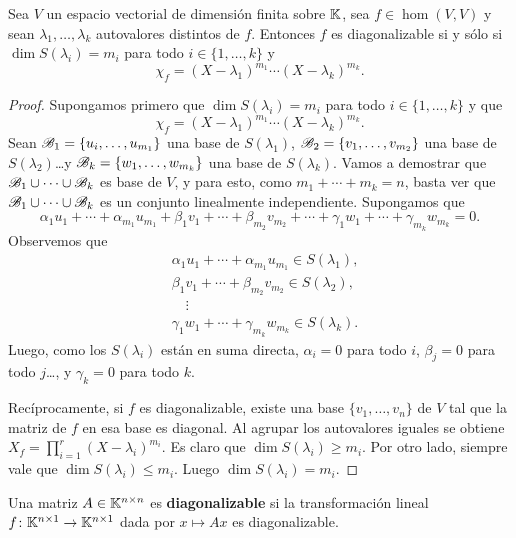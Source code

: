 \begin{thm}
    Sea $V$ un espacio vectorial de dimensión finita sobre $\mathbb{K}$, sea
    $f\in\hom(V,V)$ y sean $\lambda_1,\dots,\lambda_k$ autovalores distintos de
    $f$. Entonces $f$ es diagonalizable si y sólo si $\dim S(\lambda_i)=m_i$
    para todo $i\in\{1,\dots,k\}$ y
    \[
        \chi_f=(X-\lambda_1)^{m_1}\cdots(X-\lambda_k)^{m_k}.
    \]

	\begin{proof}
		Supongamos primero que $\dim S(\lambda_i)=m_i$ para todo
		$i\in\{1,\dots,k\}$ y que 
		\[
		\chi_f=(X-\lambda_1)^{m_1}\cdots(X-\lambda_k)^{m_k}.
		\]
		Sean $\mathscr{B}_1=\{u_{i},\dots,u_{m_1}\}$ una base de $S(\lambda_1)$,
		$\mathscr{B}_2=\{v_1,\dots,v_{m_2}\}$ una base de $S(\lambda_2)$\ldots y
		$\mathscr{B}_k=\{w_1,\dots,w_{m_k}\}$ una base de $S(\lambda_k)$. Vamos a
		demostrar que $\mathscr{B}_1\cup\cdots\cup\mathscr{B}_k$ es base de $V$, y para esto,
		como $m_1+\cdots+m_k=n$, basta ver que $\mathscr{B}_1\cup\cdots\cup\mathscr{B}_k$ es un
		conjunto linealmente independiente. Supongamos que 
		\[
		\alpha_1u_1+\cdots+\alpha_{m_1}u_{m_1}+\beta_1v_1+\cdots+\beta_{m_2}v_{m_2}+\cdots+\gamma_1 w_1+\cdots+\gamma_{m_k}w_{m_k}=0.
		\]
		Observemos que 
		\begin{align*}
		&\alpha_1u_1+\cdots+\alpha_{m_1}u_{m_1}\in S(\lambda_1),\\
		&\beta_1v_1+\cdots+\beta_{m_2}v_{m_2}\in S(\lambda_2),\\
		&\quad\vdots\\
		&\gamma_1 w_1+\cdots+\gamma_{m_k}w_{m_k}\in S(\lambda_k).
		\end{align*}
		Luego, como los $S(\lambda_i)$ están en suma directa, $\alpha_i=0$ para todo $i$, 
		$\beta_j=0$ para todo $j$\ldots, y $\gamma_k=0$ para todo $k$.

		Recíprocamente, si $f$ es diagonalizable, existe una base
		$\{v_1,\dots,v_n\}$ de $V$ tal que la matriz de $f$ en esa base es
		diagonal. Al agrupar los autovalores iguales  se obtiene
		$X_f=\prod_{i=1}^r (X-\lambda_i)^{m_i}$. Es claro que $\dim
		S(\lambda_i)\geq m_i$. Por otro lado, siempre vale que $\dim
		S(\lambda_i)\leq m_i$. Luego $\dim S(\lambda_i)=m_i$. 
	\end{proof}
\end{thm}

\begin{block}
	Una matriz $A\in\mathbb{K}^{n\times n}$ es \textbf{diagonalizable} si la
	transformación lineal $f\colon\mathbb{K}^{n\times 1}\to\mathbb{K}^{n\times1}$ dada por
	$x\mapsto Ax$ es diagonalizable.
\end{block}

